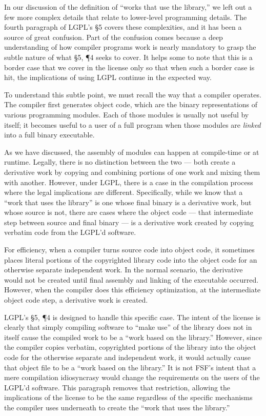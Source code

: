 In our discussion of the definition of ``works that use the library,'' we
left out a few more complex details that relate to lower-level programming
details. The fourth paragraph of LGPL's \S 5 covers these complexities,
and it has been a source of great confusion. Part of the confusion comes
because a deep understanding of how compiler programs work is nearly
mandatory to grasp the subtle nature of what \S 5, \P 4 seeks to
cover. It helps some to note that this is a border case that we cover in
the license only so that when such a border case is hit, the implications
of using LGPL continue in the expected way.

To understand this subtle point, we must recall the way that a compiler
operates. The compiler first generates object code, which are the binary
representations of various programming modules. Each of those modules is
usually not useful by itself; it becomes useful to a user of a full program
when those modules are {\em linked\/} into a full binary executable.

As we have discussed, the assembly of modules can happen at compile-time
or at runtime. Legally, there is no distinction between the two --- both
create a derivative work by copying and combining portions of one work and
mixing them with another. However, under LGPL, there is a case in the
compilation process where the legal implications are different.
Specifically, while we know that a ``work that uses the library'' is one
whose final binary is a derivative work, but whose source is not, there
are cases where the object code --- that intermediate step between source
and final binary --- is a derivative work created by copying verbatim code
from the LGPL'd software.

For efficiency, when a compiler turns source code into object code, it
sometimes places literal portions of the copyrighted library code into the
object code for an otherwise separate independent work. In the normal
scenario, the derivative would not be created until final assembly and
linking of the executable occurred. However, when the compiler does this
efficiency optimization, at the intermediate object code step, a
derivative work is created.

LGPL's \S 5, \P 4 is designed to handle this specific case. The intent of
the license is clearly that simply compiling software to ``make use'' of
the library does not in itself cause the compiled work to be a ``work
based on the library.''  However, since the compiler copies verbatim,
copyrighted portions of the library into the object code for the otherwise
separate and independent work, it would actually cause that object file to be a
``work based on the library.''  It is not FSF's intent that a mere
compilation idiosyncrasy would change the requirements on the users of the
LGPL'd software. This paragraph removes that restriction, allowing the
implications of the license to be the same regardless of the specific
mechanisms the compiler uses underneath to create the ``work that uses the
library.''

